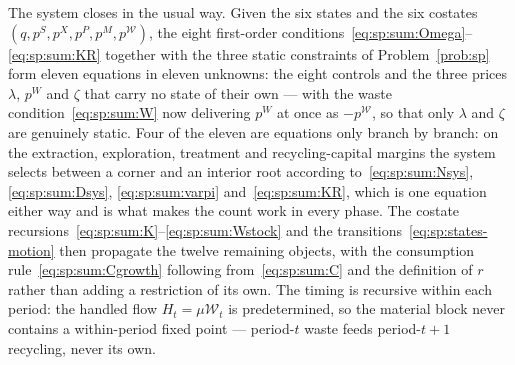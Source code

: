 The system closes in the usual way. Given the six states and the six costates $\left(q,p^S,p^X,p^P,p^M,p^{\mathcal W}\right)$, the eight first-order conditions~\eqref{eq:sp:sum:Omega}--\eqref{eq:sp:sum:KR} together with the three static constraints of Problem~\ref{prob:sp} form eleven equations in eleven unknowns: the eight controls and the three prices $\lambda$, $p^W$ and $\zeta$ that carry no state of their own --- with the waste condition~\eqref{eq:sp:sum:W} now delivering $p^W$ at once as $-p^{\mathcal W}$, so that only $\lambda$ and $\zeta$ are genuinely static. Four of the eleven are equations only branch by branch: on the extraction, exploration, treatment and recycling-capital margins the system selects between a corner and an interior root according to~\eqref{eq:sp:sum:Nsys}, \eqref{eq:sp:sum:Dsys}, \eqref{eq:sp:sum:varpi} and~\eqref{eq:sp:sum:KR}, which is one equation either way and is what makes the count work in every phase. The costate recursions~\eqref{eq:sp:sum:K}--\eqref{eq:sp:sum:Wstock} and the transitions~\eqref{eq:sp:states-motion} then propagate the twelve remaining objects, with the consumption rule~\eqref{eq:sp:sum:Cgrowth} following from~\eqref{eq:sp:sum:C} and the definition of $r$ rather than adding a restriction of its own. The timing is recursive within each period: the handled flow $H_t=\mu\mathcal W_t$ is predetermined, so the material block never contains a within-period fixed point --- period-$t$ waste feeds period-$t{+}1$ recycling, never its own.
